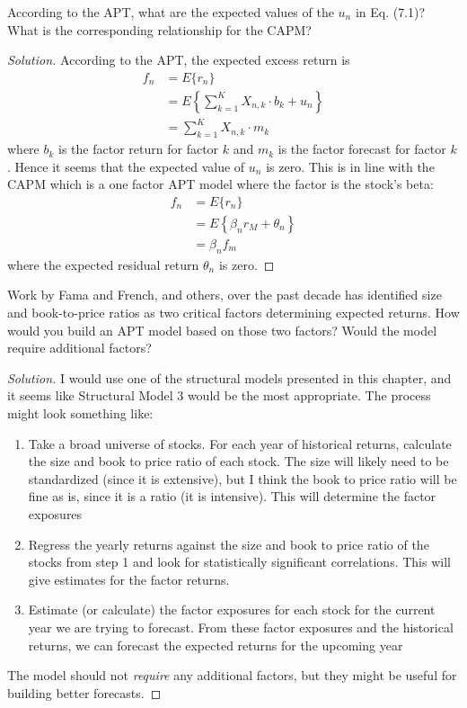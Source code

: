 \begin{problem}{7.1}
  According to the APT, what are the expected values of the $u_{n}$ in Eq. (7.1)? What is the corresponding relationship for the CAPM?
\end{problem}

\begin{proof}[Solution]
  According to the APT, the expected excess return is
  \begin{align*}
   f_{n}&=E\{r_{n}\}\\
	&=E\left\{\sum_{k=1}^{K}X_{n,k}\cdot b_{k} + u_{n}\right\}\\
	&=\sum_{k=1}^{K}X_{n,k}\cdot m_{k}
  \end{align*}
  where $b_{k}$ is the factor return for factor $k$ and $m_{k}$ is the factor forecast for factor $k$. Hence it seems that the expected value of $u_{n}$ is zero. This is in line with the CAPM which is a one factor APT model where the factor is the stock's beta:
  \begin{align*}
   f_{n}&=E\{r_{n}\}\\
	&=E\left\{\beta_{n}r_{M} + \theta_{n}\right\}\\
	&=\beta_{n}f_{m}
  \end{align*}
  where the expected residual return $\theta_{n}$ is zero.

\end{proof}

\begin{problem}{7.2}
 Work by Fama and French, and others, over the past decade has identified size and book-to-price ratios as two critical factors determining expected returns. How would you build an APT model based on those two factors? Would the model require additional factors?
\end{problem}

\begin{proof}[Solution]
 I would use one of the structural models presented in this chapter, and it seems like Structural Model 3 would be the most appropriate. The process might look something like:
 \begin{enumerate}
  \item{Take a broad universe of stocks. For each year of historical returns, calculate the size and book to price ratio of each stock. The size will likely need to be standardized (since it is extensive), but I think the book to price ratio will be fine as is, since it is a ratio (it is intensive). This will determine the factor exposures}
  \item{Regress the yearly returns against the size and book to price ratio of the stocks from step 1 and look for statistically significant correlations. This will give estimates for the factor returns.}
  \item{Estimate (or calculate) the factor exposures for each stock for the current year we are trying to forecast. From these factor exposures and the historical returns, we can forecast the expected returns for the upcoming year}
 \end{enumerate}
 The model should not \textit{require} any additional factors, but they might be useful for building better forecasts.
\end{proof}

